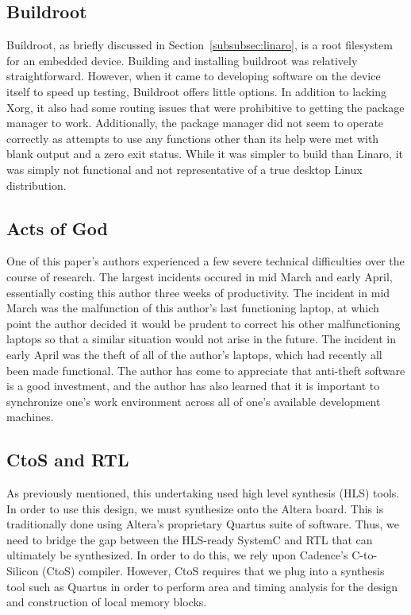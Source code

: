 \documentclass{sig-alternate-10pt}
\begin{document}
\subsection{Buildroot}
Buildroot, as briefly discussed in Section~\ref{subsubsec:linaro}, is a root
filesystem for an embedded device. Building and installing buildroot was
relatively straightforward. However, when it came to developing software on
the device itself to speed up testing, Buildroot offers little options. In
addition to lacking Xorg, it also had some routing issues that were
prohibitive to getting the package manager to work. Additionally, the
package manager did not seem to operate correctly as attempts to use any
functions other than its help were met with blank output and a zero exit
status. While it was simpler to build than Linaro, it was simply not
functional and not representative of a true desktop Linux distribution.

\subsection{Acts of God}
One of this paper's authors experienced a few severe technical difficulties
over the course of research. The largest incidents occured in mid March and
early April, essentially costing this author three weeks of productivity.
The incident in mid March was the malfunction of this author's last
functioning laptop, at which point the author decided it would be prudent to
correct his other malfunctioning laptops so that a similar situation would
not arise in the future. The incident in early April was the theft of all of
the author's laptops, which had recently all been made functional. The
author has come to appreciate that anti-theft software is a good investment,
and the author has also learned that it is important to synchronize one's
work environment across all of one's available development machines.

\subsection{CtoS and RTL}
As previously mentioned, this undertaking used high level synthesis (HLS)
tools.  In order to use this design, we must synthesize onto the Altera
board.  This is traditionally done using Altera's proprietary Quartus suite
of software.  Thus, we need to bridge the gap between the HLS-ready SystemC
and RTL that can ultimately be synthesized.  In order to do this, we rely
upon Cadence's C-to-Silicon (CtoS) compiler.  However, CtoS requires that we
plug into a synthesis tool such as Quartus in order to perform area and
timing analysis for the design and construction of local memory blocks.
\end{document}
